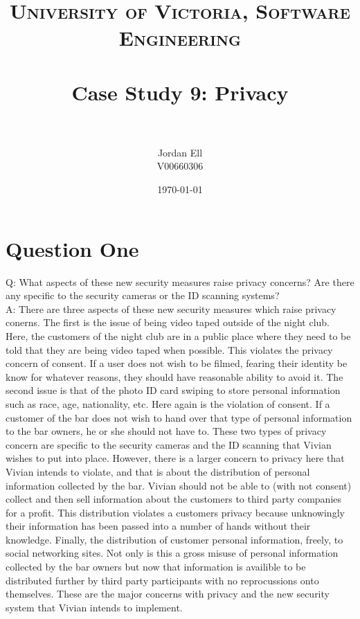 \documentclass[paper=a4, fontsize=11pt]{scrartcl} %
\title{	
\normalfont \normalsize 
\textsc{University of Victoria, Software Engineering} \\ [25pt] %
\horrule{0.5pt} \\[0.4cm] %
\huge Case Study 9: Privacy \\ %
\horrule{2pt} \\[0.5cm] %
}
\author{Jordan Ell \\ V00660306} %
\date{\normalsize\today} %
\numberwithin{equation}{section} %
\numberwithin{figure}{section} %
\numberwithin{table}{section} %
\begin{document}
\maketitle %


\section{Question One}

Q: What aspects of these new security measures raise privacy concerns? Are there any specific to the security cameras or the ID scanning systems?\\

A: There are three aspects of these new security measures which raise privacy conerns. The first is the issue of being video taped outside of the
night club. Here, the customers of the night club are in a public place where they need to be told that they are being video taped when possible.
This violates the privacy concern of consent. If a user does not wish to be filmed, fearing their identity be know for whatever reasons, they should
have reasonable ability to avoid it. The second issue is that of the photo ID card swiping to store personal information such as race, age, 
nationality, etc. Here again is the violation of consent. If a customer of the bar does not wish to hand over that type of personal information 
to the bar owners, he or she should not have to. These two types of privacy concern are specific to the security cameras and the ID scanning that
Vivian wishes to put into place. However, there is a larger concern to privacy here that Vivian intends to violate, and that is about the
distribution of personal information collected by the bar. Vivian should not be able to (with not consent) collect and then sell information 
about the customers to third party companies for a profit. This distribution violates a customers privacy because unknowingly their information
has been passed into a number of hands without their knowledge. Finally, the distribution of customer personal information, freely, to social
networking sites. Not only is this a gross misuse of personal information collected by the bar owners but now that information is availible to
be distributed further by third party participants with no reprocussions onto themselves. These are the major concerns with privacy and the
new security system that Vivian intends to implement.
\end{document}
